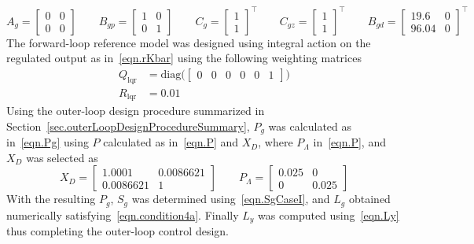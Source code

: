 \begin{equation*}
  A_{g} =
  \begin{bmatrix}
    0 & 0 \\
    0 & 0
  \end{bmatrix}
  \qquad
  B_{gp} =
  \begin{bmatrix}
    1 & 0 \\
    0 & 1
  \end{bmatrix}
  \qquad
  C_{g} =
  \begin{bmatrix}
    1 \\
    1
  \end{bmatrix}^{\top}
  \qquad
  C_{gz} =
  \begin{bmatrix}
    1 \\
    1
  \end{bmatrix}^{\top}
  \qquad
  B_{gd} =
  \begin{bmatrix}
    19.6 & 0 \\
    96.04 & 0
  \end{bmatrix}^{\top}
\end{equation*}
The forward-loop reference model was designed using integral action on the regulated output as in\ \eqref{eqn.rKbar} using the following weighting matrices
\begin{equation*}
  \begin{split}
    Q_{\text{lqr}}
    &=
    \text{diag}\bigr(
    \begin{bmatrix}
      0 & 0 & 0 & 0 & 0 & 1
    \end{bmatrix}
    \bigr) \\
    R_{\text{lqr}}
    &=
    0.01
  \end{split}
\end{equation*}
Using the outer-loop design procedure summarized in Section~\ref{sec.outerLoopDesignProcedureSummary}, $P_{g}$ was calculated as in\ \eqref{eqn.Pg} using $P$ calculated as in\ \eqref{eqn.P} and $X_{D}$, where $P_{\Lambda}$ in\ \eqref{eqn.P}, and $X_{D}$ was selected as
\begin{equation*}
  X_{D}
  =
  \begin{bmatrix}
    1.0001 & 0.0086621 \\
    0.0086621 & 1
  \end{bmatrix}
  \qquad
  P_{\Lambda}
  =
  \begin{bmatrix}
    0.025 & 0 \\
    0 & 0.025
  \end{bmatrix}
\end{equation*}
With the resulting $P_{g}$, $S_{g}$ was determined using\ \eqref{eqn.SgCaseI}, and $L_{g}$ obtained numerically satisfying\ \eqref{eqn.condition4a}.
Finally $L_{y}$ was computed using\ \eqref{eqn.Ly} thus completing the outer-loop control design.

